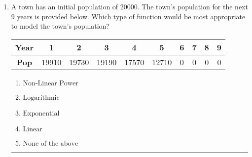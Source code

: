 \documentclass[14pt]{extbook}
\newcommand{\litem}[1]{\item#1\hspace*{-1cm}\rule{\textwidth}{0.4pt}}
\begin{document}
\begin{enumerate}
\litem{
A town has an initial population of 20000. The town's population for the next 9 years is provided below. Which type of function would be most appropriate to model the town's population?

\begin{tabular}{c|c|c|c|c|c|c|c|c|c}
\textbf{Year} &1 &2 &3 &4 &5 &6 &7 &8 &9\tabularnewline \hline
\textbf{Pop} &19910 &19730 &19190 &17570 &12710 &0 &0 &0 &0\end{tabular}\begin{enumerate}[label=\Alph*.]
\item \( \text{Non-Linear Power} \)
\item \( \text{Logarithmic} \)
\item \( \text{Exponential} \)
\item \( \text{Linear} \)
\item \( \text{None of the above} \)

\end{enumerate} }
\end{enumerate}
\end{document}
